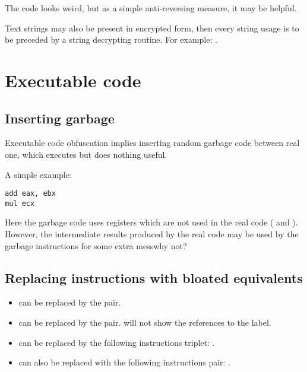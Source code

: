 The code looks weird, but as a simple anti-reversing measure, it may be helpful.

Text strings may also be present in encrypted form, 
then every string usage is to be preceded by a string decrypting routine.
For example: .

\section{Executable code}

\subsection{Inserting garbage}

Executable code obfuscation implies inserting random garbage code between real one,
which executes but does nothing useful.

A simple example:

\begin{lstlisting}[caption=original code]
add	eax, ebx
mul	ecx
\end{lstlisting}



Here the garbage code uses registers which are not used in the real code ( and ).
However, the intermediate results produced by the real code 
may be used by the garbage instructions for some extra mess\EMDASH{}why not?

\subsection{Replacing instructions with bloated equivalents}

\begin{itemize}
\item {} can be replaced by the  pair.
\item {} can be replaced by the  pair. 
\IDA{} will not show the references to the label.
\item {} can be replaced by the following instructions triplet:
.
\item {} can also be replaced with the following instructions pair: .%

\end{itemize}

